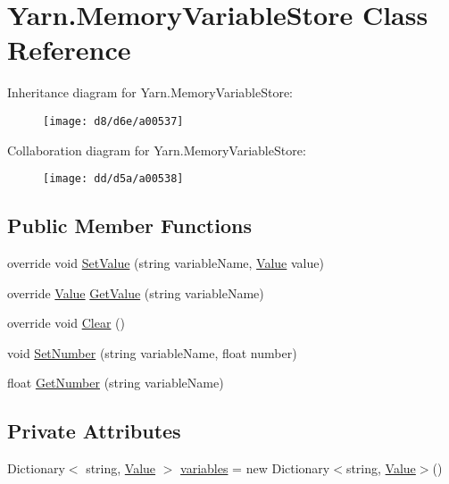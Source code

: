 \hypertarget{a00108}{\section{Yarn.\-Memory\-Variable\-Store Class Reference}
\label{a00108}
}


Inheritance diagram for Yarn.\-Memory\-Variable\-Store\-:
\nopagebreak
\begin{figure}[H]
\begin{center}
\leavevmode
\texttt{[image: d8/d6e/a00537]}
\end{center}
\end{figure}


Collaboration diagram for Yarn.\-Memory\-Variable\-Store\-:
\nopagebreak
\begin{figure}[H]
\begin{center}
\leavevmode
\texttt{[image: dd/d5a/a00538]}
\end{center}
\end{figure}
\subsection*{Public Member Functions}
\begin{DoxyCompactItemize}
\item 
override void \hyperlink{a00108_a653a459811e5c19549f4b31269093ef5}{Set\-Value} (string variable\-Name, \hyperlink{a00161}{Value} value)
\item 
override \hyperlink{a00161}{Value} \hyperlink{a00108_a0ce77e8245c504a777540e359704aa2a}{Get\-Value} (string variable\-Name)
\item 
override void \hyperlink{a00108_aa6d243e7ef02b91f793a221f509dae69}{Clear} ()
\item 
void \hyperlink{a00021_a48b93de9cd7ae61d0cd9583c8330d3ee}{Set\-Number} (string variable\-Name, float number)
\item 
float \hyperlink{a00021_a1b7f7f4468b2463e7b47986d99362279}{Get\-Number} (string variable\-Name)
\end{DoxyCompactItemize}
\subsection*{Private Attributes}
\begin{DoxyCompactItemize}
\item 
Dictionary$<$ string, \hyperlink{a00161}{Value} $>$ \hyperlink{a00108_aad18acd95297edb8ed496857337f8071}{variables} = new Dictionary$<$string, \hyperlink{a00161}{Value}$>$()
\end{DoxyCompactItemize}


